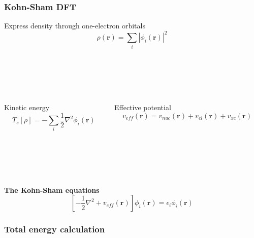 \documentclass[mathserif, 10pt]{beamer}
\begin{document}
\begin{frame}
    \frametitle{Kohn-Sham DFT}
    \centering
    Express density through one-electron orbitals
    \begin{equation}
	\nonumber
	\rho(\boldsymbol{r}) = \sum_i |\phi_i(\boldsymbol{r})|^2
    \end{equation}
    \ \\
    \ \\
    \ \\
    \ \\
    \pause
    \begin{columns}
    \begin{column}{.50\textwidth}
    \centering
    Kinetic energy
    \begin{equation}
	\nonumber
	T_s[\rho] = -\sum_i \frac{1}{2}\nabla^2\phi_i(\boldsymbol{r})
    \end{equation}
    \end{column}
    \begin{column}{.50\textwidth}
    \centering
    Effective potential
    \begin{equation}
	\nonumber
	v_{eff}(\boldsymbol{r}) = v_{nuc}(\boldsymbol{r}) + v_{el}(\boldsymbol{r}) + v_{xc}(\boldsymbol{r})
    \end{equation}
    \end{column}
    \end{columns}
    \ \\
    \ \\
    \ \\
    \ \\
    \pause
    \centering
    \textbf{The Kohn-Sham equations}
    \begin{equation}
	\nonumber
	\left[-\frac{1}{2}\nabla^2 + v_{eff}(\boldsymbol{r})\right]\phi_i(\boldsymbol{r}) = 
	\epsilon_i\phi_i(\boldsymbol{r})
    \end{equation}
\end{frame}

\begin{frame}
    \frametitle{Total energy calculation}
\end{frame}
\end{document}
